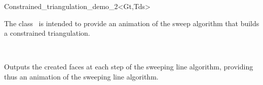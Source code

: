 \begin{ccClassTemplate}{Constrained_triangulation_demo_2<Gt,Tds>}

\ccDefinition
The class  \ccClassTemplateName\ is intended to provide
an animation of the sweep algorithm that builds a 
constrained triangulation.

\\


\ccInheritsFrom
{}

\ccTypes
{}
\ccThreeToTwo
{}

\ccCreation
{}

{Outputs the created faces at each step of
the sweeping line algorithm, providing thus an animation
of the sweeping line algorithm.}
\end{ccClassTemplate}

